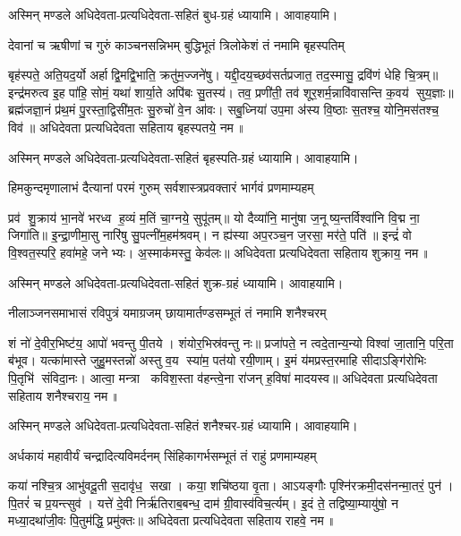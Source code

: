 अस्मिन् मण्डले अधिदेवता-प्रत्यधिदेवता-सहितं बुध-ग्रहं ध्यायामि। आवाहयामि।


\twolineshloka
{देवानां च ऋषीणां च गुरुं काञ्चनसन्निभम्}
{बुद्धिभूतं त्रिलोकेशं तं नमामि बृहस्पतिम्}

बृह॑स्पते॒ अति॒यद॒र्यो अर्हाद्वि॒मद्वि॒भाति॒ क्रतु॑म॒ज्जने॑षु। यद्दी॒दय॒च्छव॑सर्त\-प्रजात॒
तद॒स्मासु॒ द्रवि॑णं धेहि चि॒त्रम्॥ इन्द्र॑मरुत्व इ॒ह पा॑हि॒ सोमं॒ यथा॑ शार्या॒ते अपि॑बः सु॒तस्य॑।
तव॒ प्रणी॑ती॒ तव॑ शूर॒शर्म॒न्नावि॑वासन्ति क॒वय॑ सुय॒ज्ञाः॥ ब्रह्म॑जज्ञा॒नं प्र॑थ॒मं
पु॒रस्ता॒द्विसी॑म॒तः सु॒रुचो॑ वे॒न आ॑वः। सबु॒ध्निया॑ उप॒मा अ॑स्य वि॒ष्ठाः स॒तश्च॒ योनि॒मस॑तश्च॒
विव॑॥ अधिदेवता प्रत्यधिदेवता सहिताय बृहस्पतये॒ नम॥ 

अस्मिन् मण्डले अधिदेवता-प्रत्यधिदेवता-सहितं बृहस्पति-ग्रहं ध्यायामि। आवाहयामि।

\twolineshloka
{हिमकुन्दमृणालाभं दैत्यानां परमं गुरुम्}
{सर्वशास्त्रप्रवक्तारं भार्गवं प्रणमाम्यहम्}

प्रव॑ शु॒क्राय॑ भा॒नवे॑ भरध्व ह॒व्यं म॒तिं चा॒ग्नये॒ सुपू॑तम्॥ यो दैव्या॑नि॒ मानु॑षा
ज॒नूष्य॒न्तर्विश्वा॑नि वि॒द्म ना॒ जिगा॑ति॥ इ॒न्द्रा॒णीमा॒सु नारि॑षु सु॒पत्नी॑म॒हम॑श्रवम्। न
ह्य॑स्या अप॒रञ्च॒न ज॒रसा॒ मर॑ते॒ पति॑॥ इन्द्रं॑ वो वि॒श्वत॒स्परि॒ हवा॑महे॒ जनेभ्यः। अ॒स्माक॑मस्तु॒
केव॑लः॥  अधिदेवता प्रत्यधिदेवता सहिताय शुक्राय॒ नम॥ 

अस्मिन् मण्डले अधिदेवता-प्रत्यधिदेवता-सहितं शुक्र-ग्रहं ध्यायामि। आवाहयामि।

\twolineshloka
{नीलाञ्जनसमाभासं रविपुत्रं यमाग्रजम्}
{छायामार्तण्डसम्भूतं तं नमामि शनैश्चरम्}

शं नो॑ दे॒वीर॒भिष्ट॑य॒ आपो॑ भवन्तु पी॒तये। शंयोर॒भिस्र॑वन्तु नः॥ प्रजा॑पते॒ न त्वदे॒तान्य॒न्यो
विश्वा॑ जा॒तानि॒ परि॒ता ब॑भूव। यत्का॑मास्ते जुहु॒मस्तन्नो॑ अस्तु व॒य स्या॑म॒ पत॑यो रयी॒णाम्। इ॒मं
य॑मप्रस्त॒रमाहि सीदाऽङ्गि॑रोभिः पि॒तृभि॑ संविदा॒नः। आत्वा॒ मन्त्रा कविश॒स्ता व॑हन्त्वे॒ना रा॑जन्
ह॒विषा॑ मादयस्व॥  अधिदेवता प्रत्यधिदेवता सहिताय शनैश्चराय॒ नम॥ 

अस्मिन् मण्डले अधिदेवता-प्रत्यधिदेवता-सहितं शनैश्चर-ग्रहं ध्यायामि। आवाहयामि।

\twolineshloka
{अर्धकायं महावीर्यं चन्द्रादित्यविमर्दनम्}
{सिंहिकागर्भसम्भूतं तं राहुं प्रणमाम्यहम्}

कया॑ नश्चि॒त्र आभु॑वदू॒ती स॒दावृ॑ध॒ सखा। कया॒ शचि॑ष्ठया वृ॒ता। आऽयङ्गौः
पृश्नि॑रक्रमी॒दस॑नन्मा॒तरं॒ पुन॑। पि॒तरं॑ च प्र॒यन्त्सुव॑। यत्ते॑ दे॒वी निर्ऋ॑तिराब॒बन्ध॒ दाम॑
ग्री॒वास्व॑विच॒र्त्यम्। इ॒दं  ते॒ तद्विष्या॒म्यायु॑षो॒ न मध्या॒दथा॑जी॒वः पि॒तुम॑द्धि॒ प्रमु॑क्तः॥ 
अधिदेवता प्रत्यधिदेवता सहिताय राहवे॒ नम॥ 

